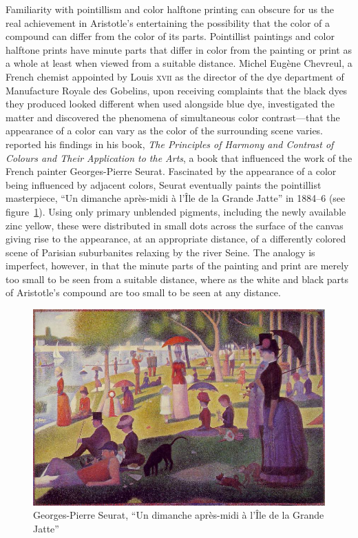 Familiarity with pointillism and color halftone printing can obscure for us the real achievement in Aristotle's entertaining the possibility that the color of a compound can differ from the color of its parts. Pointillist paintings and color halftone prints have minute parts that differ in color from the painting or print as a whole at least when viewed from a suitable distance. Michel Eugène Chevreul, a French chemist appointed by Louis \textsc{xvii} as the director of the dye department of Manufacture Royale des Gobelins, upon receiving complaints that the black dyes they produced looked different when used alongside blue dye, investigated the matter and discovered the phenomena of simultaneous color contrast---that the appearance of a color can vary as the color of the surrounding scene varies. \citet{Chevreul:1855kx} reported his findings in his book, \emph{The Principles of Harmony and Contrast of Colours and Their Application to the Arts}, a book that influenced the work of the French painter Georges-Pierre Seurat. Fascinated by the appearance of a color being influenced by adjacent colors, Seurat eventually paints the pointillist masterpiece, “Un dimanche après-midi à l'Île de la Grande Jatte” in 1884--6 (see figure~\ref{fig:jatte}). Using only primary unblended pigments, including the newly available zinc yellow, these were distributed in small dots across the surface of the canvas giving rise to the appearance, at an appropriate distance, of a differently colored scene of Parisian suburbanites relaxing by the river Seine. The analogy is imperfect, however, in that the minute parts of the painting and print are merely too small to be seen from a suitable distance, where as the white and black parts of Aristotle's compound are too small to be seen at any distance.

\begin{figure}[htbp]
    \centering
        \includegraphics[scale=0.70]{graphics/jatte.jpg}
    \caption{Georges-Pierre Seurat, “Un dimanche après-midi à l'Île de la Grande Jatte”}
    \label{fig:jatte}
\end{figure}


